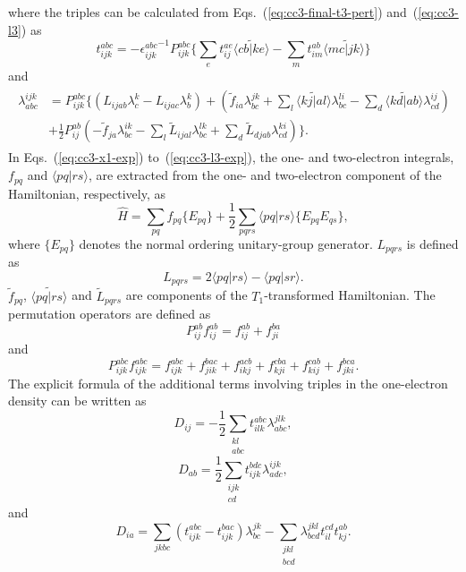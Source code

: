 where the triples can be calculated from Eqs.~(\ref{eq:cc3-final-t3-pert}) and~(\ref{eq:cc3-l3}) as
\begin{equation}
t_{ijk}^{abc}=-{\epsilon_{ijk}^{abc}}^{-1}P_{ijk}^{abc}\{\sum_{e}t_{ij}^{ae} \tilde{\langle cb|ke \rangle} 
  -\sum_{m}t_{im}^{ab} \tilde{\langle mc|jk \rangle\}}
\label{eq:cc3-t3-exp}
\end{equation}
and
\begin{align}
\begin{split}
\lambda_{abc}^{ijk}&=P_{ijk}^{abc}\{ (L_{ijab}\lambda_{c}^{k} - L_{ijac}\lambda_{b}^{k}) 
  + (\tilde{f}_{ia}\lambda_{bc}^{jk} + \sum_{l} \tilde{\langle kj|al \rangle} \lambda_{bc}^{li} - \sum_{d} \tilde{\langle kd|ab \rangle} \lambda_{cd}^{ij}) \\
 &+ \frac{1}{2}P_{ij}^{ab}(-\tilde{f}_{ja}\lambda_{bc}^{ik} - \sum_{l} \tilde{L}_{ijal}\lambda_{bc}^{lk} + \sum_{d} \tilde{L}_{djab}\lambda_{cd}^{ki}) \}.
\label{eq:cc3-l3-exp}
\end{split}
\end{align}
In Eqs.~(\ref{eq:cc3-x1-exp}) to~(\ref{eq:cc3-l3-exp}), the one- and two-electron integrals, $f_{pq}$ and $\langle pq|rs \rangle$, are extracted from the one- and two-electron component of the Hamiltonian, respectively, as 
\begin{equation}
\hat{H} = \sum_{pq}f_{pq}\{E_{pq}\} + \frac{1}{2}\sum_{pqrs}\langle pq|rs \rangle \{E_{pq}E_{qs}\},
\end{equation}
where $\{E_{pq}\}$ denotes the normal ordering unitary-group generator. $L_{pqrs}$ is defined as
\begin{equation}
L_{pqrs} = 2\langle pq|rs \rangle - \langle pq|sr \rangle.
\end{equation}
$\tilde{f}_{pq}$, $\tilde{\langle pq|rs \rangle}$ and $\tilde{L}_{pqrs}$ are components of the $T_{1}$-transformed Hamiltonian. The permutation operators are defined as 
\begin{equation}
P_{ij}^{ab}f_{ij}^{ab} = f_{ij}^{ab} + f_{ji}^{ba}
\label{eq:cc3-pijab}
\end{equation}
and
\begin{equation}
P_{ijk}^{abc}f_{ijk}^{abc} = f_{ijk}^{abc} + f_{jik}^{bac} + f_{ikj}^{acb} + f_{kji}^{cba} + f_{kij}^{cab} + f_{jki}^{bca}.
\label{eq:cc3-pijkabc}
\end{equation}
The explicit formula of the additional terms involving triples in the one-electron density can be written as
\begin{equation}
D_{ij} = -\frac{1}{2}\sum\limits_{\substack{kl\\abc}}t_{ilk}^{abc}\lambda_{abc}^{jlk},
\label{eq:cc3-dij}
\end{equation}
\begin{equation}
D_{ab} = \frac{1}{2}\sum\limits_{\substack{ijk\\cd}}t_{ijk}^{bdc}\lambda_{adc}^{ijk},
\end{equation}
and
\begin{equation}
D_{ia} = \sum_{jkbc}(t_{ijk}^{abc} - t_{ijk}^{bac})\lambda_{bc}^{jk} - \sum\limits_{\substack{jkl\\bcd}}\lambda_{bcd}^{jkl}t_{il}^{cd}t_{kj}^{ab}.
\end{equation}

